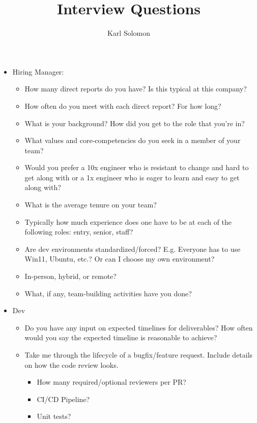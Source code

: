 \documentclass{article}
\begin{document}
\selectfont
\title{Interview Questions}
\author{Karl Solomon}

\maketitle
\small
\begin{itemize}
	\item Hiring Manager:
	      \begin{itemize}
		      \item How many direct reports do you have? Is this typical at this company?
		      \item How often do you meet with each direct report? For how long?
		      \item What is your background? How did you get to the role that you're in?
		      \item What values and core-competencies do you seek in a member of your team?
		      \item Would you prefer a 10x engineer who is resistant to change and hard to get along with or a 1x engineer who is eager to learn and easy to get along with?
		      \item What is the average tenure on your team?
		      \item Typically how much experience does one have to be at each of the following roles: entry, senior, staff?
		      \item Are dev environments standardized/forced? E.g. Everyone has to use Win11, Ubuntu, etc.? Or can I choose my own environment?
		      \item In-person, hybrid, or remote?
		      \item What, if any, team-building activities have you done?
	      \end{itemize}
	\item Dev
	      \begin{itemize}
		      \item Do you have any input on expected timelines for deliverables? How often would you say the expected timeline is reasonable to achieve?
		      \item Take me through the lifecycle of a bugfix/feature request. Include details on how the code review looks.
		            \begin{itemize}
			            \item How many required/optional reviewers per PR?
			            \item CI/CD Pipeline?
			            \item Unit tests?

\end{itemize}
\end{itemize}
\end{itemize}
\end{document}
